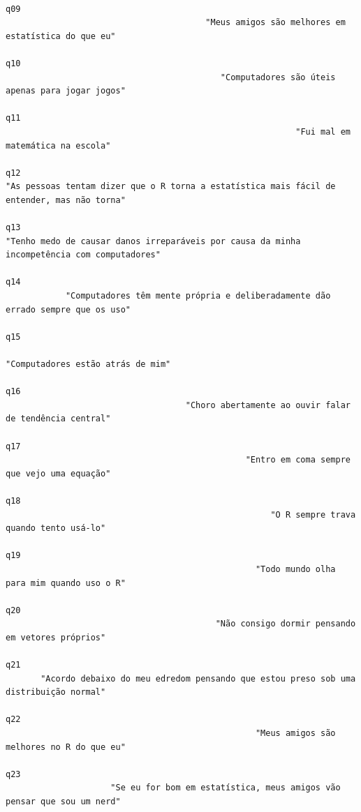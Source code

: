 \documentclass[
  letterpaper,
  DIV=11,
  numbers=noendperiod]{scrartcl}
\begin{document}
\begin{verbatim}
                                                                                        q09 
                                        "Meus amigos são melhores em estatística do que eu" 
                                                                                        q10 
                                           "Computadores são úteis apenas para jogar jogos" 
                                                                                        q11 
                                                          "Fui mal em matemática na escola" 
                                                                                        q12 
"As pessoas tentam dizer que o R torna a estatística mais fácil de entender, mas não torna" 
                                                                                        q13 
"Tenho medo de causar danos irreparáveis por causa da minha incompetência com computadores" 
                                                                                        q14 
            "Computadores têm mente própria e deliberadamente dão errado sempre que os uso" 
                                                                                        q15 
                                                          "Computadores estão atrás de mim" 
                                                                                        q16 
                                    "Choro abertamente ao ouvir falar de tendência central" 
                                                                                        q17 
                                                "Entro em coma sempre que vejo uma equação" 
                                                                                        q18 
                                                     "O R sempre trava quando tento usá-lo" 
                                                                                        q19 
                                                  "Todo mundo olha para mim quando uso o R" 
                                                                                        q20 
                                          "Não consigo dormir pensando em vetores próprios" 
                                                                                        q21 
       "Acordo debaixo do meu edredom pensando que estou preso sob uma distribuição normal" 
                                                                                        q22 
                                                  "Meus amigos são melhores no R do que eu" 
                                                                                        q23 
                     "Se eu for bom em estatística, meus amigos vão pensar que sou um nerd" 
\end{verbatim}
\end{document}
